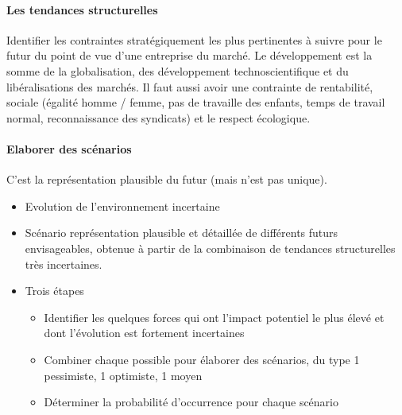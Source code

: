 \paragraph{Les tendances structurelles} Identifier les contraintes stratégiquement les plus pertinentes à suivre pour le futur du point de vue d'une entreprise du marché. Le développement est la somme de la globalisation, des développement technoscientifique et du libéralisations des marchés. Il faut aussi avoir une contrainte de rentabilité, sociale (égalité homme / femme, pas de travaille des enfants, temps de travail normal, reconnaissance des syndicats) et le respect écologique.
\paragraph{Elaborer des scénarios} C'est la représentation plausible du futur (mais n'est pas unique). 
\begin{itemize}
	\item Evolution de l'environnement incertaine
	\item Scénario représentation plausible et détaillée de différents futurs envisageables, obtenue à partir de la combinaison de tendances structurelles très incertaines.
	\item Trois étapes \begin{itemize}
			\item Identifier les quelques forces qui ont l'impact potentiel le plus élevé et dont l'évolution est fortement incertaines
			\item Combiner chaque possible pour élaborer des scénarios, du type 1 pessimiste, 1 optimiste, 1 moyen
			\item Déterminer la probabilité d'occurrence pour chaque scénario
		\end{itemize}
\end{itemize}
